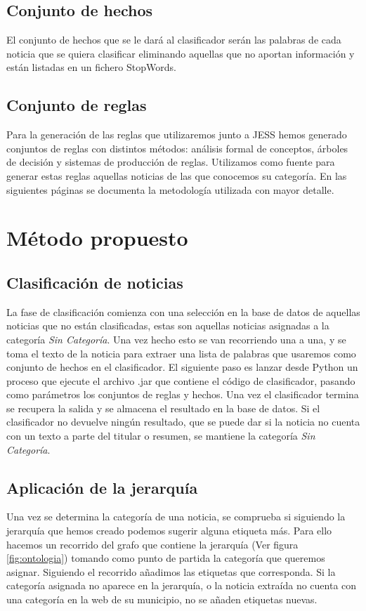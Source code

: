 \subsection{Conjunto de hechos}

El conjunto de hechos que se le dará al clasificador serán las palabras de cada noticia que se quiera clasificar eliminando aquellas que no aportan información y están listadas en un fichero StopWords.

\subsection{Conjunto de reglas}

Para la generación de las reglas que utilizaremos junto a JESS hemos generado conjuntos de reglas con distintos métodos: análisis formal de conceptos, árboles de decisión y sistemas de producción de reglas. Utilizamos como fuente para generar estas reglas aquellas noticias de las que conocemos su categoría. En las siguientes páginas se documenta la metodología utilizada con mayor detalle.

\section{Método propuesto}
\subsection{Clasificación de noticias}
La fase de clasificación comienza con una selección en la base de datos de aquellas noticias que no están clasificadas, estas son aquellas noticias asignadas a la categoría \textit{Sin Categoría}. Una vez hecho esto se van recorriendo una a una, y se toma el texto de la noticia para extraer una lista de palabras que usaremos como conjunto de hechos en el clasificador. El siguiente paso es lanzar desde Python un proceso que ejecute el archivo .jar que contiene el código de clasificador, pasando como parámetros los conjuntos de reglas y hechos. Una vez el clasificador termina se recupera la salida y se almacena el resultado en la base de datos. Si el clasificador no devuelve ningún resultado, que se puede dar si la noticia no cuenta con un texto a parte del titular o resumen, se mantiene la categoría \textit{Sin Categoría}.
\subsection{Aplicación de la jerarquía}
\label{subsec:apli_onto}
Una vez se determina la categoría de una noticia, se comprueba si siguiendo la jerarquía que hemos creado podemos sugerir alguna etiqueta más. Para ello hacemos un recorrido del grafo que contiene la jerarquía (Ver figura \ref{fig:ontologia}) tomando como punto de partida la categoría que queremos asignar. Siguiendo el recorrido añadimos las etiquetas que corresponda. Si la categoría asignada no aparece en la jerarquía, o la noticia extraída no cuenta con una categoría en la web de su municipio, no se añaden etiquetas nuevas.

